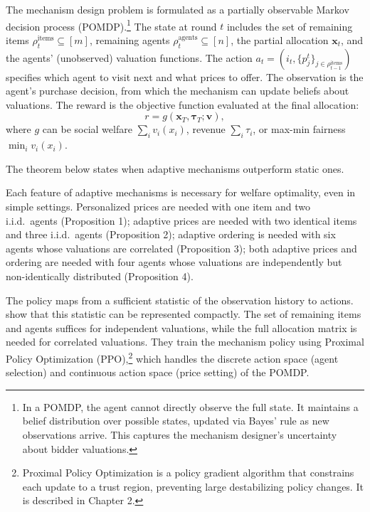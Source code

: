 The mechanism design problem is formulated as a partially observable Markov decision process (POMDP).\footnote{In a POMDP, the agent cannot directly observe the full state. It maintains a belief distribution over possible states, updated via Bayes' rule as new observations arrive. This captures the mechanism designer's uncertainty about bidder valuations.} The state at round $t$ includes the set of remaining items $\rho_t^{\text{items}} \subseteq [m]$, remaining agents $\rho_t^{\text{agents}} \subseteq [n]$, the partial allocation $\mathbf{x}_t$, and the agents' (unobserved) valuation functions. The action $a_t = (i_t, \{p_j^t\}_{j \in \rho_{t-1}^{\text{items}}})$ specifies which agent to visit next and what prices to offer. The observation is the agent's purchase decision, from which the mechanism can update beliefs about valuations. The reward is the objective function evaluated at the final allocation:
\begin{equation}
r = g(\mathbf{x}_T, \boldsymbol{\tau}_T; \mathbf{v}), \label{eq:brero_reward}
\end{equation}
where $g$ can be social welfare $\sum_{i} v_i(x_i)$, revenue $\sum_i \tau_i$, or max-min fairness $\min_i v_i(x_i)$.

The theorem below states when adaptive mechanisms outperform static ones.

\begin{theorem}
Each feature of adaptive mechanisms is necessary for welfare optimality, even in simple settings. Personalized prices are needed with one item and two i.i.d.\ agents (Proposition 1); adaptive prices are needed with two identical items and three i.i.d.\ agents (Proposition 2); adaptive ordering is needed with six agents whose valuations are correlated (Proposition 3); both adaptive prices and ordering are needed with four agents whose valuations are independently but non-identically distributed (Proposition 4).
\end{theorem}

The policy maps from a sufficient statistic of the observation history to actions. \citet{BreroEtAl2021} show that this statistic can be represented compactly. The set of remaining items and agents suffices for independent valuations, while the full allocation matrix is needed for correlated valuations. They train the mechanism policy using Proximal Policy Optimization (PPO),\footnote{Proximal Policy Optimization \citep{Schulman2017} is a policy gradient algorithm that constrains each update to a trust region, preventing large destabilizing policy changes. It is described in Chapter 2.} which handles the discrete action space (agent selection) and continuous action space (price setting) of the POMDP.

